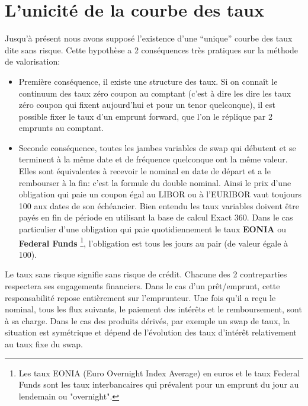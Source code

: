 \documentclass{article}
\begin{document}
\section*{L'unicité de la courbe des taux}

Jusqu’à présent nous avons supposé l’existence d’une “unique” courbe des taux dite sans risque. Cette hypothèse a 2 conséquences très pratiques sur la méthode de valorisation:\\
\begin{itemize}

\item Première conséquence, il existe une structure des taux. Si on connaît le continuum des taux zéro coupon au comptant (c’est à dire les dire les taux zéro coupon qui fixent aujourd’hui et pour un tenor quelconque), il est possible fixer le taux d’un emprunt forward, que l'on le réplique par 2 emprunts au comptant.\\

\item Seconde conséquence, toutes les jambes variables de swap qui débutent et se terminent à la même date et de fréquence quelconque ont la même valeur. Elles sont équivalentes à recevoir le nominal en date de départ et a le rembourser à la fin: c’est la formule du double nominal. Ainsi le prix d’une obligation qui paie un coupon égal au LIBOR ou à l'EURIBOR vaut toujours 100 aux dates de son échéancier. Bien entendu les taux variables doivent être payés en fin de période en utilisant la base de calcul Exact 360. Dans le cas particulier d’une obligation qui paie quotidiennement le taux \textbf{EONIA} ou \textbf{Federal Funds} \footnote{Les taux EONIA (Euro Overnight Index Average) en euros et le taux Federal Funds sont les taux interbancaires qui prévalent pour un emprunt du jour au lendemain ou "overnight".}, l’obligation est tous les jours au pair (de valeur égale à 100).\\ 

\end{itemize}

Le taux sans risque signifie sans risque de crédit. Chacune des 2 contreparties respectera ses engagements financiers. Dans le cas d’un prêt/emprunt, cette responsabilité repose entièrement sur l’emprunteur. Une fois qu’il a reçu le nominal, tous les flux suivants, le paiement des intérêts et le remboursement, sont à sa charge. Dans le cas des produits dérivés, par exemple un swap de taux, la situation est symétrique et dépend de l’évolution des taux d’intérêt relativement au taux fixe du swap.\\
\end{document}
